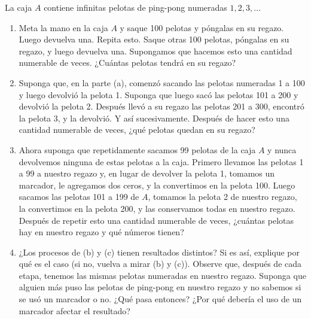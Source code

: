 \message{ !name(main.tex)}\documentclass[12pt,a4paper]{book}
\begin{document}
    \begin{ejercicio}
        La caja $A$ contiene infinitas pelotas de ping-pong numeradas $1,2,3,\dots$
        \begin{enumerate}[label=(\alph*)]
            \item Meta la mano en la caja $A$ y saque 100 pelotas y póngalas en su regazo. Luego devuelva una. Repita
            esto. Saque otras 100 pelotas, póngalas en su regazo, y luego devuelva una. Supongamos que hacemos esto una
            cantidad numerable de veces. ¿Cuántas pelotas tendrá en su regazo?
            \item Suponga que, en la parte (a), comenzó sacando las pelotas numeradas 1 a 100 y luego devolvió la pelota 1.
            Suponga que luego sacó las pelotas 101 a 200 y devolvió la pelota 2. Después llevó a su regazo las pelotas
            201 a 300, encontró la pelota 3, y la devolvió. Y así sucesivamente. Después de hacer esto una cantidad
            numerable de veces, ¿qué pelotas quedan en su regazo?
            \item Ahora suponga que repetidamente sacamos 99 pelotas de la caja $A$ y nunca devolvemos ninguna de estas
            pelotas a la caja. Primero llevamos las pelotas 1 a 99 a nuestro regazo y, en lugar de devolver la pelota 1,
            tomamos un marcador, le agregamos dos ceros, y la convertimos en la pelota 100. Luego sacamos las pelotas 101
            a 199 de $A$, tomamos la pelota 2 de nuestro regazo, la convertimos en la pelota 200, y las conservamos todas
            en nuestro regazo. Después de repetir esto una cantidad numerable de veces, ¿cuántas pelotas hay en nuestro
            regazo y qué números tienen?
            \item ¿Los procesos de (b) y (c) tienen resultados distintos? Si es así, explique por qué es el caso (si no,
            vuelva a mirar (b) y (c)). Observe que, después de cada etapa, tenemos las mismas pelotas numeradas en nuestro
            regazo. Suponga que alguien más puso las pelotas de ping-pong en nuestro regazo y no sabemos si se usó un
            marcador o no. ¿Qué pasa entonces? ¿Por qué debería el uso de un marcador afectar el resultado?
        \end{enumerate}
    \end{ejercicio}
\end{document}
